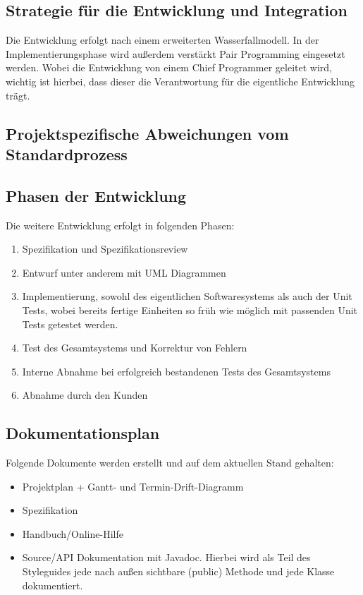 \documentclass[a4paper,10pt]{scrartcl}
\begin{document}
\subsection{Strategie für die Entwicklung und Integration}
Die Entwicklung erfolgt nach einem erweiterten Wasserfallmodell.
In der Implementierungsphase wird außerdem verstärkt Pair Programming eingesetzt werden.
Wobei die Entwicklung von einem Chief Programmer geleitet wird, wichtig ist hierbei, dass dieser die Verantwortung für die eigentliche Entwicklung trägt.
\subsection{Projektspezifische Abweichungen vom Standardprozess}

\subsection{Phasen der Entwicklung}
Die weitere Entwicklung erfolgt in  folgenden Phasen:
\begin{enumerate}
\item
Spezifikation und Spezifikationsreview
\item
Entwurf unter anderem mit UML Diagrammen
\item
Implementierung, sowohl des  eigentlichen Softwaresystems als auch der Unit Tests,
wobei bereits fertige Einheiten so früh wie möglich mit passenden Unit Tests getestet werden.
\item 
Test des Gesamtsystems und Korrektur von Fehlern
\item
Interne Abnahme bei erfolgreich bestandenen Tests des Gesamtsystems
\item
Abnahme durch den Kunden
\end{enumerate}
\subsection{Dokumentationsplan}
Folgende Dokumente werden erstellt und auf dem aktuellen Stand gehalten:
\begin{itemize}
\item Projektplan + Gantt- und Termin-Drift-Diagramm
\item Spezifikation
\item Handbuch/Online-Hilfe
\item Source/API Dokumentation mit Javadoc. Hierbei wird als Teil des Styleguides jede nach außen sichtbare (public) Methode und jede Klasse dokumentiert.
\end{itemize}
\end{document}
